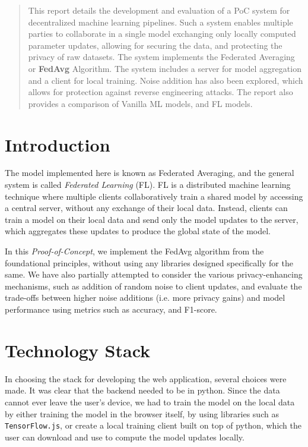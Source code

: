 \documentclass[10pt,twocolumn]{article}
\begin{document}
\tableofcontents

\begin{abstract}
\small
This report details the development and evaluation of a PoC system for decentralized machine learning pipelines. Such a system enables multiple parties to collaborate in a single model exchanging only locally computed parameter updates, allowing for securing the data, and protecting the privacy of raw datasets. The system implements the Federated Averaging or \textbf{FedAvg} Algorithm. The system includes a server for model aggregation and a client for local training. Noise addition has also been explored, which allows for protection against reverse engineering attacks. The report also provides a comparison of Vanilla ML models, and FL models.
\end{abstract}

\section{Introduction}
The model implemented here is known as Federated Averaging, and the general system is called \textit{Federated Learning} (FL). FL is a distributed machine learning technique where multiple clients collaboratively train a shared model by accessing a central server, without any exchange of their local data. Instead, clients can train a model on their local data and send only the model updates to the server, which aggregates these updates to produce the global state of the model. 

In this \textit{Proof-of-Concept}, we implement the FedAvg algorithm from the foundational principles, without using any libraries designed specifically for the same. We have also partially attempted to consider the various privacy-enhancing mechanisms, such as addition of random noise to client updates, and evaluate the trade-offs between higher noise additions (i.e. more privacy gains) and model performance using metrics such as accuracy, and F1-score.  


\section{Technology Stack}
In choosing the stack for developing the web application, several choices were made. It was clear that the backend needed to be in python. Since the data cannot ever leave the user's device, we had to train the model on the local data by either training the model in the browser itself, by using libraries such as \texttt{TensorFlow.js}, or create a local training client built on top of python, which the user can download and use to compute the model updates locally. 
\end{document}
